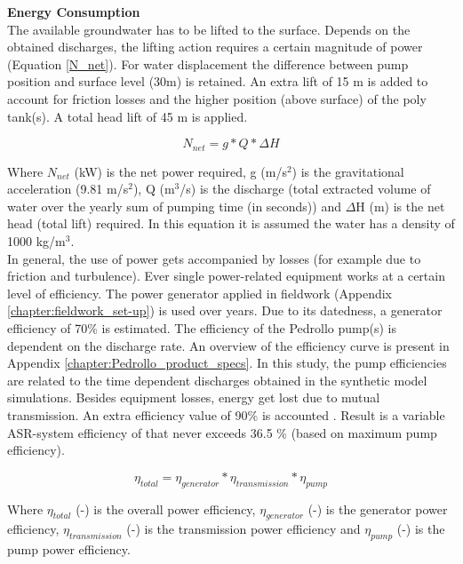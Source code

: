 \textbf{Energy Consumption} \\
The available groundwater has to be lifted to the surface. Depends on the obtained discharges, the lifting action requires a certain magnitude of power (Equation \ref{N_net}). For water displacement the difference between pump position and surface level (30m) is retained. An extra lift of 15 m is added to account for friction losses and the higher position (above surface) of the poly tank(s). A total head lift of 45 m is applied.

\begin{equation}
N_{net} =  g * Q * \Delta H
\label{N_net}
\end{equation}

Where $N_{net}$ (kW) is the net power required, g (m/s$^2$) is the gravitational acceleration (9.81 m/s$^2$), Q (m$^3$/s) is the discharge (total extracted volume of water over the yearly sum of pumping time (in seconds)) and $\Delta$H (m) is the net head (total lift) required. In this equation it is assumed the water has a density of 1000 kg/m$^3$. \\

In general, the use of power gets accompanied by losses (for example due to friction and turbulence). Ever single power-related equipment works at a certain level of efficiency. The power generator applied in fieldwork (Appendix \ref{chapter:fieldwork_set-up}) is used over years. Due to its datedness, a generator efficiency of 70\% is estimated. The efficiency of the Pedrollo pump(s) is dependent on the discharge rate. An overview of the efficiency curve is present in Appendix \ref{chapter:Pedrollo_product_specs}. In this study, the pump efficiencies are related to the time dependent discharges obtained in the synthetic model simulations. Besides equipment losses, energy get lost due to mutual transmission. An extra efficiency value of 90\% is accounted \citep{VandeGiesen2013}. Result is a variable ASR-system efficiency of that never exceeds 36.5 \% (based on maximum pump efficiency).

\begin{equation}
 \eta_{total} =   \eta_{generator} * \eta_{transmission} * \eta_{pump} \end{equation}

Where $\eta_{total}$ (-) is the overall power efficiency, $\eta_{generator}$ (-) is the generator power efficiency, $\eta_{transmission}$ (-) is the transmission power efficiency and $\eta_{pump}$ (-) is the pump power efficiency. \\

